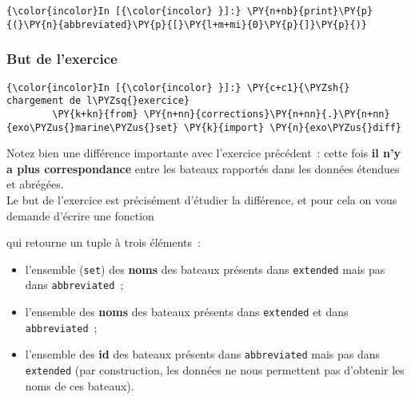     \begin{Verbatim}[commandchars=\\\{\}]
{\color{incolor}In [{\color{incolor} }]:} \PY{n+nb}{print}\PY{p}{(}\PY{n}{abbreviated}\PY{p}{[}\PY{l+m+mi}{0}\PY{p}{]}\PY{p}{)}
\end{Verbatim}


    \hypertarget{but-de-lexercice}{%
\subsubsection{But de l'exercice}\label{but-de-lexercice}}

    \begin{Verbatim}[commandchars=\\\{\}]
{\color{incolor}In [{\color{incolor} }]:} \PY{c+c1}{\PYZsh{} chargement de l\PYZsq{}exercice}
        \PY{k+kn}{from} \PY{n+nn}{corrections}\PY{n+nn}{.}\PY{n+nn}{exo\PYZus{}marine\PYZus{}set} \PY{k}{import} \PY{n}{exo\PYZus{}diff}
\end{Verbatim}


    Notez bien une différence importante avec l'exercice précédent~: cette
fois \textbf{il n'y a plus correspondance} entre les bateaux rapportés
dans les données étendues et abrégées.\\

Le but de l'exercice est précisément d'étudier la différence, et pour
cela on vous demande d'écrire une fonction

\begin{Shaded}
\begin{Highlighting}[]
\end{Highlighting}
\end{Shaded}

qui retourne un tuple à trois éléments~:

\begin{itemize}
	\item 
	l'ensemble (\texttt{set}) des
	\textbf{noms} des bateaux présents dans \texttt{extended} mais pas dans
	\texttt{abbreviated}~;
	\item
	l'ensemble des \textbf{noms} des bateaux
	présents dans \texttt{extended} et dans \texttt{abbreviated}~;
	\item
	l'ensemble des \textbf{id} des bateaux présents dans
	\texttt{abbreviated} mais pas dans \texttt{extended} (par construction,
	les données ne nous permettent pas d'obtenir les noms de ces bateaux).
\end{itemize}

